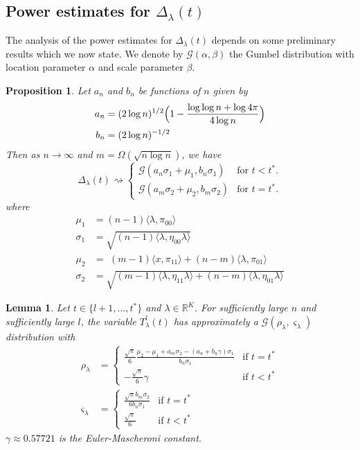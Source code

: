 \documentclass[draftcls]{IEEEtran}
\newtheorem{lemma}[theorem]{Lemma}
\newtheorem{proposition}[theorem]{Proposition}
\theoremstyle{definition}
\begin{document}
\subsection{Power estimates for $\Delta_{\lambda}(t)$}
The analysis of the power estimates for $\Delta_{\lambda}(t)$ depends
on some preliminary results which we now state. We denote by
$\mathcal{G}(\alpha, \beta)$ the Gumbel distribution with location
parameter $\alpha$ and scale parameter $\beta$.  
\begin{proposition}
  \label{prop:3}
  Let $a_n$ and $b_n$ be functions of $n$ given by
  \begin{align*}
    a_n &= (2 \log{n})^{1/2}\Bigl(1 - \frac{\log{\log{n}} + \log{4\pi}}{4 \log{n}} \Bigr) \\ 
    b_n &= (2 \log{n})^{-1/2}
  \end{align*}
  Then as $n \rightarrow \infty$ and $m = \Omega( \sqrt{n \log{n}})$,
  we have
  \begin{equation}
    \label{eq:14}
    \Delta_{\lambda}(t) \rightsquigarrow \begin{cases}
      \mathcal{G}(a_n \sigma_1 + \mu_1, b_n \sigma_1 ) & \text{for $t < t^{*}$.} \\
     \mathcal{G}(a_m \sigma_2 + \mu_2, b_m \sigma_2) &
     \text{for $t = t^{*}$.}
     \end{cases}
  \end{equation}
  where
  \begin{align*}
    \mu_1 &= (n-1)\langle \lambda, \pi_{00} \rangle \\
    \sigma_1 &= \sqrt{(n-1)\langle \lambda, \eta_{00} \lambda \rangle} \\
    \mu_2 &= \,\, (m - 1) \langle x, \pi_{11} \rangle + (n-
    m)\langle \lambda, \pi_{01} \rangle
    \\ \sigma_2 &= \sqrt{ (m - 1) \langle \lambda, \eta_{11} \lambda \rangle + (n -
      m) \langle \lambda, \eta_{01} \lambda \rangle}
    \end{align*}
\end{proposition}
\begin{lemma}
  \label{lem:2}
  Let $t \in \{l+1, \dots, t^{*}\}$ and $\lambda \in
  \mathbb{R}^{K}$. For sufficiently large $n$ and sufficiently large
  $l$, the variable $T_{\lambda}^{l}(t)$ has approximately a
  $\mathcal{G}(\rho_{\lambda}, \varsigma_{\lambda})$ distribution with
\begin{align}
  \label{eq:13}
  \rho_{\lambda} &= \begin{cases}
    \frac{\sqrt{\pi}}{6} \frac{\mu_2 - \mu_1 + a_m\sigma_2 - (a_n + b_n
      \gamma)\sigma_1}{b_n \sigma_1} & \text{if $t =
        t^{*}$} \\
      - \frac{ \sqrt{\pi}}{6} \gamma & \text{if $t < t^{*}$}
  \end{cases}\\
  \varsigma_{\lambda} &= \begin{cases}
    \frac{\sqrt{\pi} b_m \sigma_2}{6 b_n \sigma_1} & \text{if $t =
      t^{*}$} \\
    \frac{\sqrt{\pi}}{6} & \text{if $t < t^{*}$}
    \end{cases}
\end{align}
$\gamma \approx 0.57721$ is the Euler-Mascheroni constant.
\end{lemma}
\end{document}
